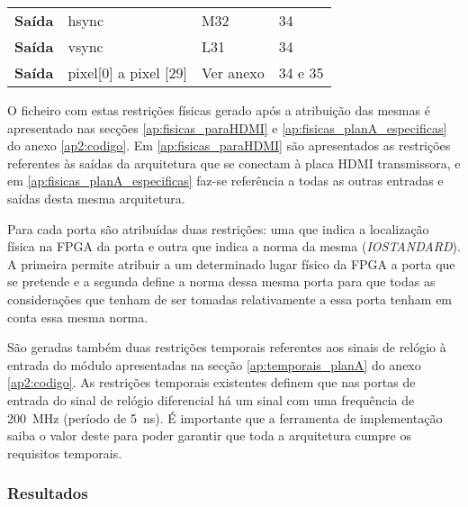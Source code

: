 \begin{table}[h!]
\begin{tabular}{rlll}
			\multicolumn{1}{r|}{\textbf{Saída}}   & hsync                              & M32                                      & 34                                         \\
			\multicolumn{1}{r|}{\textbf{Saída}}   & vsync                              & L31                                      & 34                                         \\
			\multicolumn{1}{r|}{\textbf{Saída}}   & pixel[0] a pixel [29]                              & Ver anexo                                & 34 e 35                                    \\ \hline
		\end{tabular}

\end{table}

O ficheiro com estas restrições físicas gerado após a atribuição das mesmas é apresentado nas secções \ref{ap:fisicas_paraHDMI} e \ref{ap:fisicas_planA_especificas} do anexo \ref{ap2:codigo}. Em \ref{ap:fisicas_paraHDMI} são apresentados as restrições referentes às saídas da arquitetura que se conectam à placa HDMI transmissora, e em \ref{ap:fisicas_planA_especificas} faz-se referência a todas as outras entradas e saídas desta mesma arquitetura.

Para cada porta são atribuídas duas restrições: uma que indica a localização física na FPGA da porta e outra que indica a norma da mesma (\textit{IOSTANDARD}). A primeira permite atribuir a um determinado lugar físico da FPGA a porta que se pretende e a segunda define a norma dessa mesma porta para que todas as considerações que tenham de ser tomadas relativamente a essa porta tenham em conta essa mesma norma.

São geradas também duas restrições temporais referentes aos sinais de relógio à entrada do módulo apresentadas na secção \ref{ap:temporais_planA} do anexo \ref{ap2:codigo}. As restrições temporais existentes definem que nas portas de entrada do sinal de relógio diferencial há um sinal com uma frequência de \SI{200}{\mega\hertz} (período de \SI{5}{\nano\second}). É importante que a ferramenta de implementação saiba o valor deste para poder garantir que toda a arquitetura cumpre os requisitos temporais.

\subsubsection*{Resultados}

